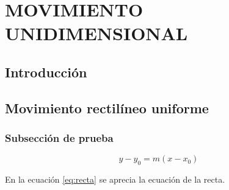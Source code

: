 \chapter{MOVIMIENTO UNIDIMENSIONAL}
\section{Introducción}
\section{Movimiento rectilíneo uniforme}
\subsection{Subsección de prueba}


\begin{equation}\label{eq:recta}
  y - y_0 = m(x - x_0)
\end{equation}

En la ecuación \ref{eq:recta} se aprecia la ecuación de la recta.

